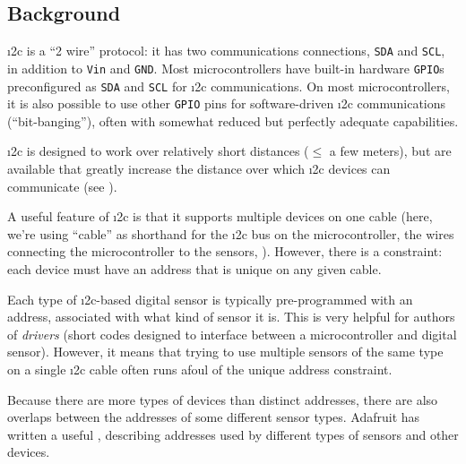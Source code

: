 \subsection{Background}
\i2c is a ``2 wire'' protocol: it has two communications connections, \texttt{SDA} and \texttt{SCL}, in addition to \texttt{Vin} and \texttt{GND}.
Most microcontrollers have built-in hardware  \texttt{GPIO}s preconfigured as \texttt{SDA} and \texttt{SCL} for \i2c communications.
On most microcontrollers, it is also possible to use other \texttt{GPIO} pins for software-driven \i2c communications (``bit-banging''), often with somewhat reduced but perfectly adequate capabilities.

\i2c is designed to work over relatively short distances ($\le$ a few meters), but  are available that greatly increase the distance over which \i2c devices can communicate (see ).

A useful feature of \i2c is that it supports multiple devices on one cable (here, we're using ``cable'' as shorthand for the \i2c bus on the microcontroller, the wires connecting the microcontroller to the sensors, \etc).
However, there is a constraint: each device must have an address that is unique on any given cable.

Each type of \i2c-based digital sensor is typically pre-programmed with an address, associated with what kind of sensor it is.
This is very helpful for authors of \emph{drivers} (short codes designed to interface between a microcontroller and digital sensor).
However, it means that trying to use multiple sensors of the same type on a single \i2c cable often runs afoul of the unique address constraint.

Because there are more types of devices than distinct addresses, there are also overlaps between the addresses of some different sensor types.
Adafruit has written a useful , describing addresses used by different types of sensors and other devices.

